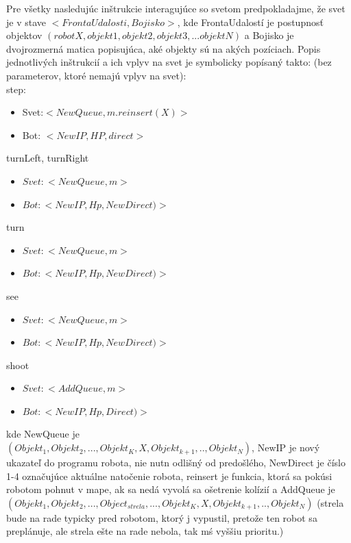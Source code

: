 Pre všetky nasledujúc inštrukcie interagujúce so svetom predpokladajme, že svet je v stave $<FrontaUdalosti, Bojisko>$, kde FrontaUdalostí je postupnosť objektov $(robot X, objekt1, objekt2, objekt3,...objektN)$ a Bojisko je dvojrozmerná matica popisujúca, aké objekty sú na akých pozíciach.
Popis jednotlivých inštrukcií a ich vplyv na svet je symbolicky popísaný takto: (bez parameterov, ktoré nemajú vplyv na svet):\\
\newline
step:\begin {itemize}
\item Svet:$ < NewQueue, m.reinsert(X) > $
\item Bot: $ < NewIP, HP, direct> $
\end {itemize}
turnLeft, turnRight \begin{itemize}
\item $Svet:  <NewQueue, m>$
\item $Bot:  < NewIP, Hp, NewDirect)>$
\end{itemize}
turn  \begin{itemize}
\item $Svet:  < NewQueue, m > $
\item $Bot:   < NewIP, Hp, NewDirect)> $
\end {itemize}
see  \begin{itemize}
\item $Svet:  <NewQueue,m> $
\item $ Bot:  < NewIP, Hp, NewDirect)> $
\end {itemize}
shoot \begin {itemize}
\item $ Svet:  < AddQueue, m> $ 
\item $ Bot:  < NewIP, Hp, Direct)>  $
\end {itemize}
\indent
kde NewQueue je \\ $(Objekt_1, Objekt_2, ..., Objekt_K, X, Objekt_{k+1},.., Objekt_N)$, NewIP je nový ukazateľ do programu robota, nie nutn odlišný od predošlého, NewDirect je číslo 1-4 označujúce aktuálne natočenie robota, reinsert je funkcia, ktorá sa pokúsi robotom pohnut v mape, ak sa nedá vyvolá sa ošetrenie kolízií a AddQueue je\\ $(Objekt_1, Objekt_2, ...,Object_{strela},..., Objekt_K, X, Objekt_{k+1},.., Objekt_N)$ (strela bude na rade typicky pred robotom, ktorý j vypustil, pretože ten robot sa preplánuje, ale strela ešte na rade nebola, tak mś vyššiu prioritu.)

